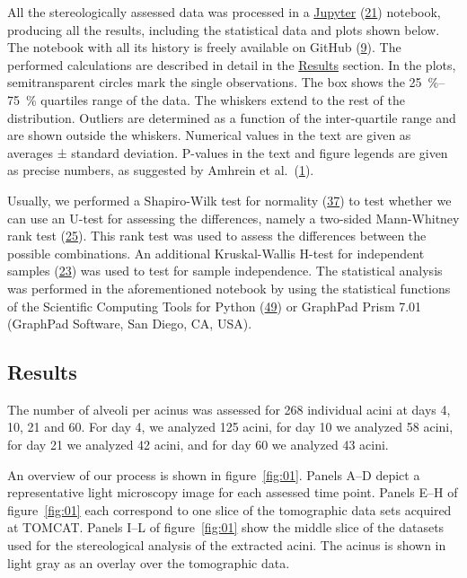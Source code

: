 \documentclass[
  american,
]{article}
\begin{document}
All the stereologically assessed data was processed in a \href{http://jupyter.org/}{Jupyter} (\protect\hyperlink{ref-pQ6Wbz73}{21}) notebook, producing all the results, including the statistical data and plots shown below.
The notebook with all its history is freely available on GitHub (\protect\hyperlink{ref-V87xbt0b}{9}).
The performed calculations are described in detail in the \protect\hyperlink{results}{Results} section.
In the plots, semitransparent circles mark the single observations.
The box shows the 25~\%--75~\% quartiles range of the data.
The whiskers extend to the rest of the distribution.
Outliers are determined as a function of the inter-quartile range and are shown outside the whiskers.
Numerical values in the text are given as averages ± standard deviation.
P-values in the text and figure legends are given as precise numbers, as suggested by Amhrein et al.~(\protect\hyperlink{ref-o21zxPIu}{1}).

Usually, we performed a Shapiro-Wilk test for normality (\protect\hyperlink{ref-IkHrgIj3}{37}) to test whether we can use an U-test for assessing the differences, namely a two-sided Mann-Whitney rank test (\protect\hyperlink{ref-MyzxBJ57}{25}).
This rank test was used to assess the differences between the possible combinations.
An additional Kruskal-Wallis H-test for independent samples (\protect\hyperlink{ref-ON1Bppkk}{23}) was used to test for sample independence.
The statistical analysis was performed in the aforementioned notebook by using the statistical functions of the Scientific Computing Tools for Python (\protect\hyperlink{ref-8Miti2Gz}{49}) or GraphPad Prism 7.01 (GraphPad Software, San Diego, CA, USA).

\hypertarget{results}{%
\subsection{Results}\label{results}}

The number of alveoli per acinus was assessed for 268 individual acini at days 4, 10, 21 and 60.
For day 4, we analyzed 125 acini, for day 10 we analyzed 58 acini, for day 21 we analyzed 42 acini, and for day 60 we analyzed 43 acini.

An overview of our process is shown in figure~\ref{fig:01}.
Panels A--D depict a representative light microscopy image for each assessed time point.
Panels E--H of figure~\ref{fig:01} each correspond to one slice of the tomographic data sets acquired at TOMCAT.
Panels I--L of figure~\ref{fig:01} show the middle slice of the datasets used for the stereological analysis of the extracted acini.
The acinus is shown in light gray as an overlay over the tomographic data.
\end{document}
